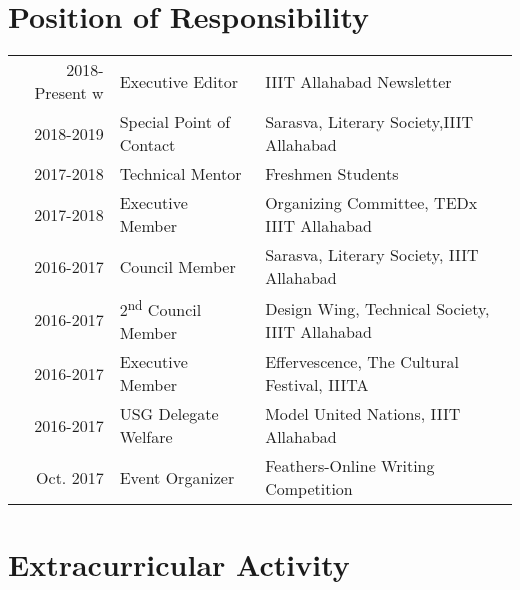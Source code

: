 \documentclass[12pt]{deedy-resume-openfont}
\begin{document}
\section{Position of Responsibility} 
\begin{tabular}{rll}
\vspace{\topsep} 
2018- Present w & Executive Editor &IIIT Allahabad Newsletter  \\
\vspace{\topsep} 
2018-2019     &Special Point of Contact & Sarasva, Literary Society,IIIT Allahabad  \\
\vspace{\topsep} 
2017-2018     & Technical Mentor & Freshmen Students  \\
\vspace{\topsep} 
2017-2018     & Executive Member & Organizing Committee, TEDx IIIT Allahabad  \\
\vspace{\topsep} 
2016-2017	     & Council Member  & Sarasva, Literary Society, IIIT Allahabad\\
\vspace{\topsep} 
2016-2017	     & 2\textsuperscript{nd} Council Member  & Design Wing, Technical Society, IIIT Allahabad\\
\vspace{\topsep} 
2016-2017	     &Executive Member  & Effervescence, The Cultural Festival, IIITA\\
\vspace{\topsep} 
2016-2017	     & USG Delegate Welfare  & Model United Nations, IIIT Allahabad\\
\vspace{\topsep} 
Oct. 2017     & Event Organizer & Feathers-Online Writing Competition \\

\end{tabular}
\sectionsep

\section{Extracurricular Activity} 
\end{document}
